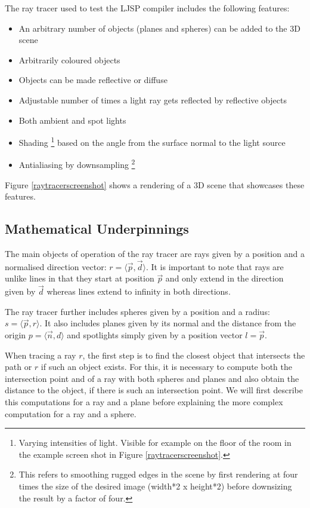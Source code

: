 \documentclass[11pt]{report}
\begin{document}
The ray tracer used to test the LJSP compiler includes the following features:
\begin{itemize}
\item An arbitrary number of objects (planes and spheres) can be added to the 3D scene
\item Arbitrarily coloured objects
\item Objects can be made reflective or diffuse
\item Adjustable number of times a light ray gets reflected by reflective objects
\item Both ambient and spot lights
\item Shading \footnote{Varying intensities of light. Visible for example on the floor of the room in the example screen shot in Figure \ref{raytracerscreenshot}.} based on the angle from the surface normal to the light source
\item Antialiasing by downsampling \footnote{This refers to smoothing rugged edges in the scene by first rendering at four times the size of the desired image (width*2 x height*2) before downsizing the result by a factor of four.} 
\end{itemize}

Figure \ref{raytracerscreenshot} shows a rendering of a 3D scene that showcases these features.

\subsection{Mathematical Underpinnings}
The main objects of operation of the ray tracer are rays given by a position and a normalised direction vector: $r = \langle \vec{p}, \vec{d} \rangle$. It is important to note that rays are unlike lines in that they start at position $\vec{p}$ and only extend in the direction given by $\vec{d}$ whereas lines extend to infinity in both directions.

The ray tracer further includes spheres given by a position and a radius: $s = \langle \vec{p}, r \rangle$. It also includes planes given by its normal and the distance from the origin $p = \langle \vec{n}, d \rangle$ and spotlights simply given by a position vector $l = \vec{p}$.

When tracing a ray $r$, the first step is to find the closest object that intersects the path or $r$ if such an object exists. For this, it is necessary to compute both the intersection point and of a ray with both spheres and planes and also obtain the distance to the object, if there is such an intersection point. We will first describe this computations for a ray and a plane before explaining the more complex computation for a ray and a sphere.
\end{document}
